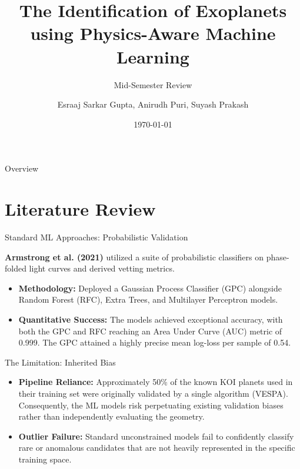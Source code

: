 \documentclass[9pt, aspectratio=169]{beamer}
\title{The Identification of Exoplanets using Physics-Aware Machine Learning}
\subtitle{Mid-Semester Review}
\author{Esraaj Sarkar Gupta, Anirudh Puri, Suyash Prakash}
\date{\today}
\institute{Machine Learning and Pattern Recognition / Plaksha University}
\begin{document}
\maketitle

\begin{frame}{Overview}
    \tableofcontents
\end{frame}

\section{Literature Review}
\begin{frame}{Standard ML Approaches: Probabilistic Validation}
    
    \textbf{Armstrong et al. (2021)} utilized a suite of probabilistic classifiers on phase-folded light curves and derived vetting metrics.
    
    \vspace{0.2cm}
    \begin{itemize}
        \item \textbf{Methodology:} Deployed a Gaussian Process Classifier (GPC) alongside Random Forest (RFC), Extra Trees, and Multilayer Perceptron models.
        \item \textbf{Quantitative Success:} The models achieved exceptional accuracy, with both the GPC and RFC reaching an Area Under Curve (AUC) metric of 0.999. The GPC attained a highly precise mean log-loss per sample of 0.54.
    \end{itemize}

    \vspace{0.2cm}
    \begin{block}{The Limitation: Inherited Bias}
        \begin{itemize}
            \item \textbf{Pipeline Reliance:} Approximately 50\% of the known KOI planets used in their training set were originally validated by a single algorithm (VESPA). Consequently, the ML models risk perpetuating existing validation biases rather than independently evaluating the geometry.
            \item \textbf{Outlier Failure:} Standard unconstrained models fail to confidently classify rare or anomalous candidates that are not heavily represented in the specific training space.
        \end{itemize}
    \end{block}
\end{frame}
\end{document}
